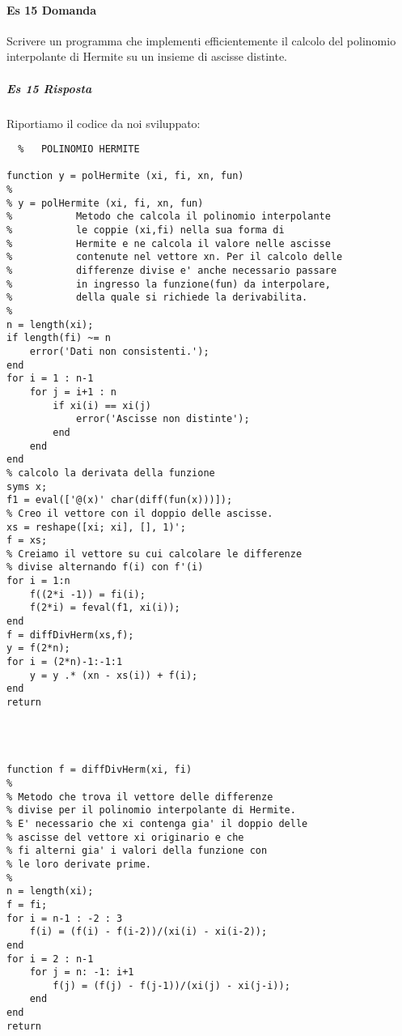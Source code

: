 \documentclass[a4paper]{report}
\begin{document}
\paragraph{Es 15 Domanda}
Scrivere un programma che implementi efficientemente il calcolo del polinomio interpolante di Hermite su un insieme di ascisse distinte.
\subparagraph{Es 15 Risposta}
Riportiamo il codice da noi sviluppato:\\
\begin{lstlisting}	%	POLINOMIO HERMITE

function y = polHermite (xi, fi, xn, fun) 
%
% y = polHermite (xi, fi, xn, fun)
%           Metodo che calcola il polinomio interpolante
%           le coppie (xi,fi) nella sua forma di 
%           Hermite e ne calcola il valore nelle ascisse
%           contenute nel vettore xn. Per il calcolo delle
%           differenze divise e' anche necessario passare
%           in ingresso la funzione(fun) da interpolare,
%           della quale si richiede la derivabilita.
%
n = length(xi);
if length(fi) ~= n
	error('Dati non consistenti.');
end
for i = 1 : n-1
	for j = i+1 : n
		if xi(i) == xi(j)
			error('Ascisse non distinte');
		end 
	end
end
% calcolo la derivata della funzione
syms x;
f1 = eval(['@(x)' char(diff(fun(x)))]);
% Creo il vettore con il doppio delle ascisse.
xs = reshape([xi; xi], [], 1)';
f = xs;
% Creiamo il vettore su cui calcolare le differenze
% divise alternando f(i) con f'(i) 
for i = 1:n
	f((2*i -1)) = fi(i);
	f(2*i) = feval(f1, xi(i));
end
f = diffDivHerm(xs,f);
y = f(2*n);
for i = (2*n)-1:-1:1
	y = y .* (xn - xs(i)) + f(i);
end
return




function f = diffDivHerm(xi, fi)
%
% Metodo che trova il vettore delle differenze 
% divise per il polinomio interpolante di Hermite.
% E' necessario che xi contenga gia' il doppio delle 
% ascisse del vettore xi originario e che
% fi alterni gia' i valori della funzione con
% le loro derivate prime.
%
n = length(xi);
f = fi;
for i = n-1 : -2 : 3
	f(i) = (f(i) - f(i-2))/(xi(i) - xi(i-2));
end
for i = 2 : n-1
	for j = n: -1: i+1
		f(j) = (f(j) - f(j-1))/(xi(j) - xi(j-i));
	end
end
return
\end{lstlisting}
\newpage
\end{document}
